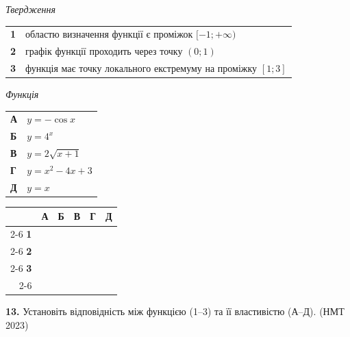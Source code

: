 \documentclass[14pt]{extarticle}
\newcommand{\answerGrid}{
    \begingroup
    \setlength{\tabcolsep}{4pt}
    \renewcommand{\arraystretch}{1.2}
    \small
    \begin{tabular}{r|c|c|c|c|c|}
         \multicolumn{1}{c}{} & \multicolumn{1}{c}{\textbf{А}} & \multicolumn{1}{c}{\textbf{Б}} & \multicolumn{1}{c}{\textbf{В}} & \multicolumn{1}{c}{\textbf{Г}} & \multicolumn{1}{c}{\textbf{Д}} \\ \cline{2-6}
         \textbf{1} & & & & & \\ \cline{2-6}
         \textbf{2} & & & & & \\ \cline{2-6}
         \textbf{3} & & & & & \\ \cline{2-6}
    \end{tabular}
    \endgroup
}
\newcommand{\nmtyear}[1]{\hfill{\small\color{yearcolor}(НМТ #1)}}
\begin{document}
\noindent
\begin{minipage}[t]{0.55\textwidth}
    \textit{Твердження} \par \vspace{0.2cm}
    \begin{tabular}{@{}p{0.5cm} p{8cm}@{}}
    \textbf{1} & областю визначення функції є проміжок $[-1; +\infty)$ \\[0.2cm]
    \textbf{2} & графік функції проходить через точку $(0; 1)$ \\[0.2cm]
    \textbf{3} & функція має точку локального екстремуму на проміжку $[1; 3]$ \\
    \end{tabular}
\end{minipage}%
\hfill
\begin{minipage}[t]{0.40\textwidth}
    \textit{Функція} \par \vspace{0.2cm}
    \begin{tabular}{@{}p{0.5cm} p{5cm}@{}}
    \textbf{А} & $y = -\cos x$ \\[0.2cm]
    \textbf{Б} & \colorbox{yellow!30}{$y = 4^x$} \\[0.2cm]
    \textbf{В} & $y = 2\sqrt{x + 1}$ \\[0.2cm]
    \textbf{Г} & $y = x^2 - 4x + 3$ \\[0.2cm]
    \textbf{Д} & $y = x$ \\
    \end{tabular}
\end{minipage}
\vspace{0.3cm}

\answerGrid
\vspace{0.7cm}

\noindent\textbf{13.} Установіть відповідність між функцією (1–3) та її властивістю (А–Д). \nmtyear{2023}
\vspace{0.3cm}
\end{document}
